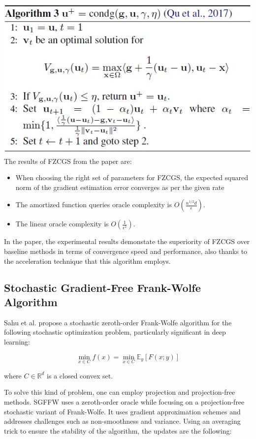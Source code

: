 \documentclass[10pt,twocolumn,letterpaper]{article}
\begin{document}
\includegraphics*[scale=0.7]{img/condg_pseudocode.jpg} \\


The results of FZCGS from the paper are:

\begin{itemize}
   \item When choosing the right set of parameters for FZCGS, the expected squared norm of the gradient estimation error converges as per the given rate
   \item The amortized function queries oracle complexity is $O\left(\frac{n^{1 / 2} d}{\epsilon}\right)$.
   \item The linear oracle complexity is $O\left(\frac{1}{\epsilon^{2}}\right)$.
\end{itemize}

In the paper, the experimental results demonstate the superiority of FZCGS over baseline methods
in terms of convergence speed and performance, also thanks to the acceleration technique that this algorithm employs.

\subsection{Stochastic Gradient-Free Frank-Wolfe Algorithm}

Sahu et al.\cite{Sahu} propose a stochastic zeroth-order Frank-Wolfe algorithm for the following stochastic
optimization problem, particularly significant in deep learning:

\[
\min _{x \in C} f(x)=\min _{x \in C} \mathbb{E}_{y}[F(x ; y)]
\]

where $C \in \mathbb{R}^{d}$ is a closed convex set.

To solve this kind of problem, one can employ projection and projection-free methods.
SGFFW uses a zeroth-order oracle while focusing on a projection-free stochastic variant
of Frank-Wolfe. It uses gradient approximation schemes and addresses challenges such as non-smoothness
and variance. Using an averaging trick to ensure the stability of the algorithm,
the updates are the following:
\end{document}
